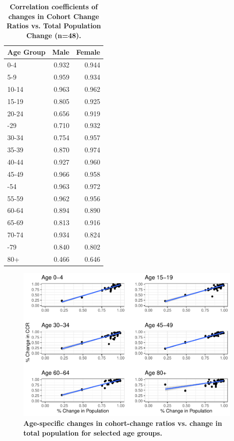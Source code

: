 \documentclass[12pt]{article}
\begin{document}
\begin{table}

\caption{\textbf{Correlation coefficients of changes in Cohort Change Ratios vs. Total Population Change (n=48).}}
\centering
\begin{tabular}[t]{lrr}
\toprule
Age Group & Male & Female\\
\midrule
0-4 & 0.932 & 0.944\\
5-9 & 0.959 & 0.934\\
10-14 & 0.963 & 0.962\\
15-19 & 0.805 & 0.925\\
20-24 & 0.656 & 0.919\\
\addlinespace
25-29 & 0.710 & 0.932\\
30-34 & 0.754 & 0.957\\
35-39 & 0.870 & 0.974\\
40-44 & 0.927 & 0.960\\
45-49 & 0.966 & 0.958\\
\addlinespace
50-54 & 0.963 & 0.972\\
55-59 & 0.962 & 0.956\\
60-64 & 0.894 & 0.890\\
65-69 & 0.813 & 0.916\\
70-74 & 0.934 & 0.824\\
\addlinespace
75-79 & 0.840 & 0.802\\
80+ & 0.466 & 0.646\\
\bottomrule
\end{tabular}\label{CorTable}
\end{table}

\begin{figure}
\includegraphics[width=1\linewidth]{CCRfig-1} \caption{\textbf{Age-specific changes in cohort-change ratios vs. change in total population for selected age groups.} \label{fig:Ageresults}}\label{fig:figagemodel}
\end{figure}
\end{document}
